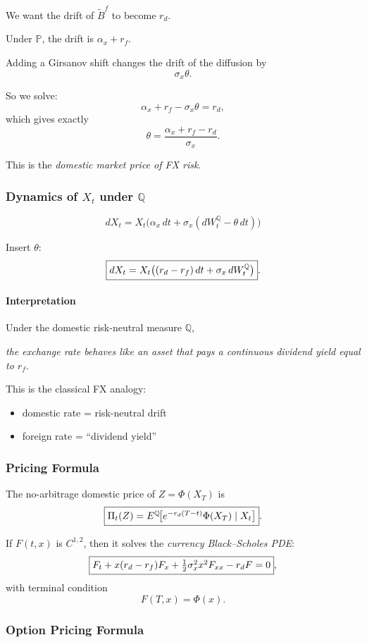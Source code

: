 \documentclass[12pt,a4paper]{article}
\theoremstyle{definition}
\begin{document}
We want the drift of $\widetilde{B}^f$ to become $r_d$.

Under $\mathbb{P}$, the drift is $\alpha_x + r_f$.

Adding a Girsanov shift changes the drift of the diffusion by
\[
\sigma_x \theta.
\]

So we solve:
\[
\alpha_x + r_f - \sigma_x \theta = r_d,
\]
which gives exactly
\[
\theta = \frac{\alpha_x + r_f - r_d}{\sigma_x}.
\]

This is the \emph{domestic market price of FX risk}.

\subsubsection{Dynamics of $X_t$ under $\mathbb{Q}$}

\[
dX_t = X_t\big(\alpha_x\, dt + \sigma_x(dW_t^\mathbb{Q} - \theta\, dt)\big)
\]

Insert $\theta$:
\[
\fbox{$dX_t = X_t\big((r_d - r_f)\, dt + \sigma_x\, dW_t^\mathbb{Q}\big)$}.
\]

\paragraph{Interpretation}

Under the domestic risk-neutral measure $\mathbb{Q}$,

\emph{the exchange rate behaves like an asset that pays a continuous dividend yield equal to $r_f$}.

This is the classical FX analogy:
\begin{itemize}
\item domestic rate = risk-neutral drift
\item foreign rate = ``dividend yield''
\end{itemize}

\subsubsection{Pricing Formula}

The no-arbitrage domestic price of $Z = \Phi(X_T)$ is
\[
\fbox{$\Pi_t(Z) = E^\mathbb{Q}\!\big[e^{-r_d(T-t)}\Phi(X_T) \mid X_t\big]$}.
\]

If $F(t, x)$ is $C^{1,2}$, then it solves the \emph{currency Black--Scholes PDE}:
\[
\fbox{$F_t + x(r_d - r_f) F_x + \tfrac{1}{2}\sigma_x^2 x^2 F_{xx} - r_d F = 0$},
\]
with terminal condition
\[
F(T, x) = \Phi(x).
\]

\subsubsection{Option Pricing Formula}
\end{document}
